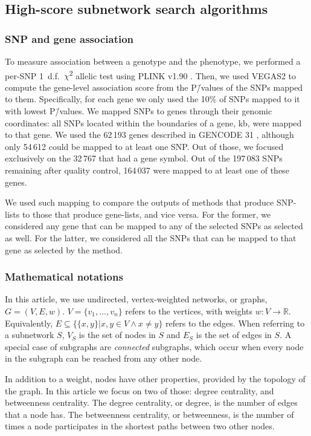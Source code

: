 \documentclass[10pt,letterpaper]{article}
\begin{document}
\subsection{High-score subnetwork search algorithms}
\subsubsection{SNP and gene association}
\label{methods:node_score}
To measure association between a genotype and the phenotype, we performed a per-SNP 1~d.f.~\(\chi\)\textsuperscript{2} allelic test using PLINK v1.90 \cite{chang_second-generation_2015}. Then, we used VEGAS2 \cite{mishra_vegas2:_2015} to compute the gene-level association score from the P\=/values of the SNPs mapped to them. Specifically, for each gene we only used the 10\% of SNPs mapped to it with lowest P\=/values. We mapped SNPs to genes through their genomic coordinates: all SNPs located within the boundaries of a gene,  kb, were mapped to that gene. We used the 62\,193 genes described in GENCODE 31 \cite{frankish_gencode_2019}, although only 54\,612 could be mapped to at least one SNP. Out of those, we focused exclusively on the 32\,767 that had a gene symbol. Out of the 197\,083 SNPs remaining after quality control, 164\,037 were mapped to at least one of these genes. 

We used such mapping to compare the outputs of methods that produce SNP-lists to those that produce gene-lists, and vice versa. For the former, we considered any gene that can be mapped to any of the selected SNPs as selected as well. For the latter, we considered all the SNPs that can be mapped to that gene as selected by the method.

\subsubsection{Mathematical notations}
\label{methods:notation}
In this article, we use undirected, vertex-weighted networks, or graphs, $G = (V,E,w)$. $V = \{v_{1}, \dots{}, v_{n}\}$ refers to the vertices, with weights $w: V \rightarrow \mathbb{R}$. Equivalently, $E \subseteq \{\{x,y\} | x,y \in V \wedge x \neq y\}$ refers to the edges. When referring to a subnetwork $S$, $V_{S}$ is the set of nodes in $S$ and $E_{S}$ is the set of edges in $S$. A special case of subgraphs are \emph{connected} subgraphs, which occur when every node in the subgraph can be reached from any other node.

In addition to a weight, nodes have other properties, provided by the topology of the graph. In this article we focus on two of those: degree centrality, and betweenness centrality. The degree centrality, or degree, is the number of edges that a node has. The betweenness centrality, or betweenness, is the number of times a node participates in the shortest paths between two other nodes.
\end{document}
